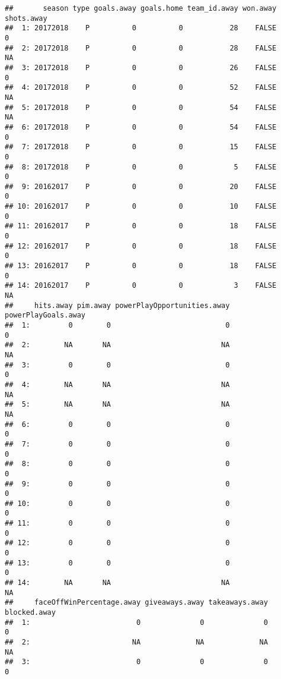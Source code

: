 \documentclass[
]{article}
\begin{document}
\begin{verbatim}
##       season type goals.away goals.home team_id.away won.away shots.away
##  1: 20172018    P          0          0           28    FALSE          0
##  2: 20172018    P          0          0           28    FALSE         NA
##  3: 20172018    P          0          0           26    FALSE          0
##  4: 20172018    P          0          0           52    FALSE         NA
##  5: 20172018    P          0          0           54    FALSE         NA
##  6: 20172018    P          0          0           54    FALSE          0
##  7: 20172018    P          0          0           15    FALSE          0
##  8: 20172018    P          0          0            5    FALSE          0
##  9: 20162017    P          0          0           20    FALSE          0
## 10: 20162017    P          0          0           10    FALSE          0
## 11: 20162017    P          0          0           18    FALSE          0
## 12: 20162017    P          0          0           18    FALSE          0
## 13: 20162017    P          0          0           18    FALSE          0
## 14: 20162017    P          0          0            3    FALSE         NA
##     hits.away pim.away powerPlayOpportunities.away powerPlayGoals.away
##  1:         0        0                           0                   0
##  2:        NA       NA                          NA                  NA
##  3:         0        0                           0                   0
##  4:        NA       NA                          NA                  NA
##  5:        NA       NA                          NA                  NA
##  6:         0        0                           0                   0
##  7:         0        0                           0                   0
##  8:         0        0                           0                   0
##  9:         0        0                           0                   0
## 10:         0        0                           0                   0
## 11:         0        0                           0                   0
## 12:         0        0                           0                   0
## 13:         0        0                           0                   0
## 14:        NA       NA                          NA                  NA
##     faceOffWinPercentage.away giveaways.away takeaways.away blocked.away
##  1:                         0              0              0            0
##  2:                        NA             NA             NA           NA
##  3:                         0              0              0            0

\end{verbatim}
\end{document}

